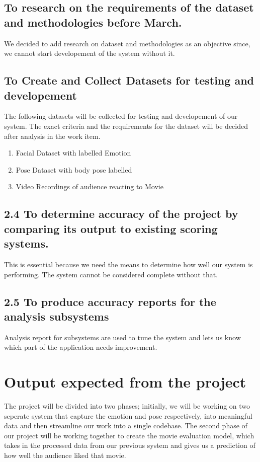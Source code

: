 \documentclass[12pt,a4paper,man]{report}
\begin{document}
\subsection{To research on the requirements of the dataset and methodologies before March.}
\label{sec:org86b4077}
We decided to add research on dataset and methodologies as an objective since, we cannot start developement of the system without it.

\subsection{To Create and Collect Datasets for testing and developement}
\label{sec:orgdb7b198}
The following datasets will be collected for testing and developement of our system. The exact criteria and the requirements for the dataset will be decided after analysis in the work item.
\begin{enumerate}
\item Facial Dataset with labelled Emotion
\item Pose Dataset with body pose labelled
\item Video Recordings of audience reacting to Movie
\end{enumerate}

\subsection{2.4 To determine accuracy of the project by comparing its output to existing scoring systems.}
\label{sec:orgbfaa023}
This is essential because we need the means to determine how well our system is performing. The system cannot be considered complete without that.
\subsection{2.5 To produce accuracy reports for the analysis subsystems}
\label{sec:org9a6fb91}
Analysis report for subsystems are used to tune the system and lets us know which part of the application needs improvement. 

\section{Output expected from the project}
\label{sec:orgc09c50e}

The project will be divided into two phases; initially, we will be working on two seperate system that capture the emotion and pose respectively, into meaningful data and then streamline our work into a single codebase. The second phase of our project will be working together to create the movie evaluation model, which takes in the processed data from our previous system and gives us a prediction of how well the audience liked that movie. 
\end{document}
